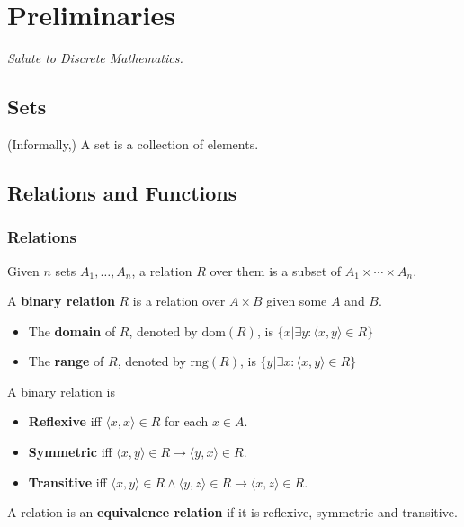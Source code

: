 \chapter{Preliminaries}
\emph{Salute to Discrete Mathematics.}

\section{Sets}
\label{sec:Sets}
(Informally,) A set is a collection of elements.

\section{Relations and Functions}
\label{sec:RelationsAndFunctions}

\subsection{Relations}
\label{sub:Relation}
Given $n$ sets $A_1,\dots,A_n$, a relation $R$ over them is a subset of $A_1 \times \cdots \times A_n$.

\begin{definition}
    \label{def:BinaryRelation}
    A \textbf{binary relation} $R$ is a relation over $A \times B$ given some $A$ and $B$.
    \begin{itemize}
        \item The \textbf{domain} of $R$, denoted by $\textrm{dom}(R)$, is $\{ x | \exists y: \langle x,y \rangle \in R \}$
        \item The \textbf{range} of $R$, denoted by $\textrm{rng}(R)$, is $\{ y | \exists x: \langle x,y \rangle \in R \}$
    \end{itemize}
\end{definition}

A binary relation is
\begin{itemize}
    \item \textbf{Reflexive} iff $\langle x, x \rangle \in R$ for each $x \in A$.
    \item \textbf{Symmetric} iff $\langle x,y \rangle \in R \longrightarrow \langle y,x \rangle \in R$.
    \item \textbf{Transitive} iff $\langle x,y \rangle \in R \land \langle y,z \rangle \in R \longrightarrow \langle x,z \rangle \in R$.
\end{itemize}

A relation is an \textbf{equivalence relation} if it is reflexive, symmetric and transitive.


